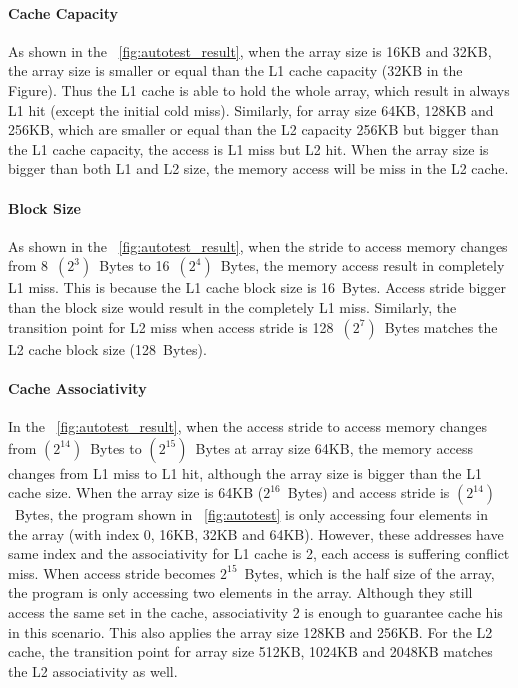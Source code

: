 \documentclass[12pt]{report}
\newcommand{\Fig}[1]{\figurename~\ref{#1}}
\begin{document}
\paragraph{Cache Capacity}
As shown in the \Fig{fig:autotest_result}, when the array size is 16KB and 32KB, the array size is smaller or equal than the L1 cache capacity (32KB in the Figure). Thus the L1 cache is able to hold the whole array, which result in always L1 hit (except the initial cold miss). Similarly, for array size 64KB, 128KB and 256KB, which are smaller or equal than the L2 capacity 256KB but bigger than the L1 cache capacity, the access is L1 miss but L2 hit. When the array size is bigger than both L1 and L2 size, the memory access will be miss in the L2 cache.

\paragraph{Block Size}
As shown in the \Fig{fig:autotest_result}, when the stride to access memory changes from 8~$(2^3)$~Bytes to 16~$(2^4)$~Bytes, the memory access result in completely L1 miss. This is because the L1 cache block size is 16~Bytes. Access stride bigger than the block size would result in the completely L1 miss. Similarly, the transition point for L2 miss when access stride is 128~$(2^7)$~Bytes matches the L2 cache block size (128~Bytes).

\paragraph{Cache Associativity}
In the \Fig{fig:autotest_result}, when the access stride to access memory changes from $(2^{14})$~Bytes to $(2^{15})$~Bytes at array size 64KB, the memory access changes from L1 miss to L1 hit, although the array size is bigger than the L1 cache size. When the array size is 64KB ($2^{16}$~Bytes) and access stride is $(2^{14})$~Bytes, the program shown in \Fig{fig:autotest} is only accessing four elements in the array (with index 0, 16KB, 32KB and 64KB). However, these addresses have same index and the associativity for L1 cache is 2, each access is suffering conflict miss. When access stride becomes $2^{15}$~Bytes, which is the half size of the array, the program is only accessing two elements in the array. Although they still access the same set in the cache, associativity 2 is enough to guarantee cache his in this scenario. This also applies the array size 128KB and 256KB. For the L2 cache, the transition point for array size 512KB, 1024KB and 2048KB matches the L2 associativity as well.
\end{document}
